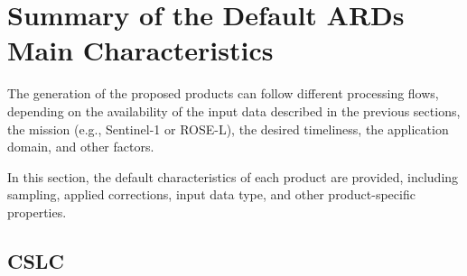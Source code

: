 \section{Summary of the Default ARDs Main Characteristics}
\label{sec:prod_summ}

The generation of the proposed products can follow different processing flows, depending on the availability of the input data described in the previous sections, the mission (e.g., Sentinel-1 or ROSE-L), the desired timeliness, the application domain, and other factors.

In this section, the default characteristics of each product are provided, including sampling, applied corrections, input data type, and other product-specific properties.

\subsection{CSLC}
\label{sec:cslc_summ}

